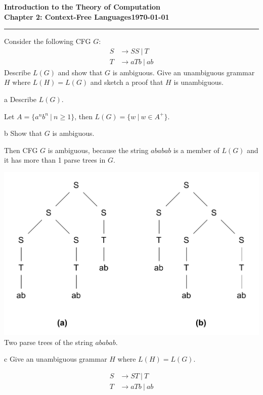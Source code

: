\documentclass[11pt]{article}
\newcommand{\dated}{\today}
\begin{document}
\textbf{Introduction to the Theory of
Computation}\hfill\textbf{\myname}\\[0.01in]
\textbf{Chapter 2: Context-Free Languages}\hfill\textbf{\dated}\\
\smallskip\hrule\bigskip

\begin{problem}{2.46}
Consider the following CFG $G$:
\begin{align*}
S &\rightarrow SS \ | \ T \\
T &\rightarrow aTb \ | \ ab
\end{align*}
Describe $L(G)$ and show that $G$ is ambiguous. Give an unambiguous grammar $H$ where $L(H) = L(G)$ and sketch a proof that $H$ is unambiguous.
\end{problem}

\begin{problem}[Part]{a}
Describe $L(G)$.
\end{problem}

Let $A = \{a^nb^n \ | \ n \geq 1\}$, then $L(G) = \{w \ | \ w \in A^+\}$.

\begin{problem}[Part]{b}
Show that $G$ is ambiguous.
\end{problem}

Then CFG $G$ is ambiguous, because the string $ababab$ is a member of $L(G)$ and it has more than 1 parse trees in $G$.

\begin{center}
\includegraphics[scale=0.8]{Figures/Problem2.46a.pdf} \\
Two parse trees of the string $ababab$.
\end{center}

\begin{problem}[Part]{c}
Give an unambiguous grammar $H$ where $L(H) = L(G)$.
\end{problem}
\begin{align*}
S &\rightarrow ST \ | \ T \\
T &\rightarrow aTb \ | \ ab
\end{align*}
\end{document}
